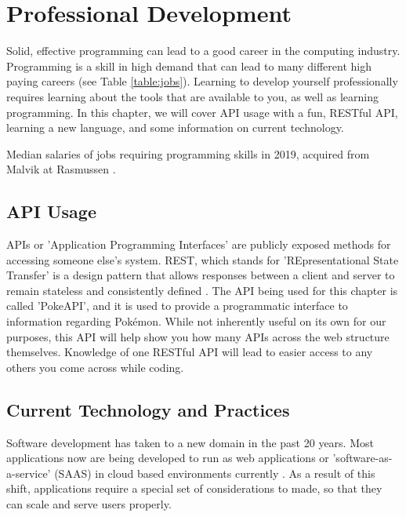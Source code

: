 \documentclass[12pt, oneside, a4paper]{book}
\begin{document}
   \chapter{Professional Development}
   \label{chap:prof_devel}
      Solid, effective programming can lead to a good career in the computing industry.
      Programming is a skill in high demand that can lead to many different high paying careers (see Table \ref*{table:jobs}).
      Learning to develop yourself professionally requires learning about the tools that are available to you, as well as learning programming.
      In this chapter, we will cover API usage with a fun, RESTful API, learning a new language, and some information on current technology.
      \begin{table}[H]
         \caption{
            Median salaries of jobs requiring programming skills in 2019, acquired from Malvik at Rasmussen \autocite{malvikProgrammingCareersCoding}.
         }
         \label{table:jobs}
      \end{table}

      \section{API Usage}
      APIs or 'Application Programming Interfaces' are publicly exposed methods for accessing someone else's system.
      REST, which stands for 'REpresentational State Transfer' is a design pattern that allows responses between a client and server to remain stateless and consistently defined \autocite{hallettPokeAPI}.
      The API being used for this chapter is called 'PokeAPI', and it is used to provide a programmatic interface to information regarding Pokémon.
      While not inherently useful on its own for our purposes, this API will help show you how many APIs across the web structure themselves.
      Knowledge of one RESTful API will lead to easier access to any others you come across while coding.

      \section{Current Technology and Practices}
      Software development has taken to a new domain in the past 20 years.
      Most applications now are being developed to run as web applications or 'software-as-a-service' (SAAS) in cloud based environments currently \autocite{WhatCloudComputing}.
      As a result of this shift, applications require a special set of considerations to made, so that they can scale and serve users properly.
\end{document}
